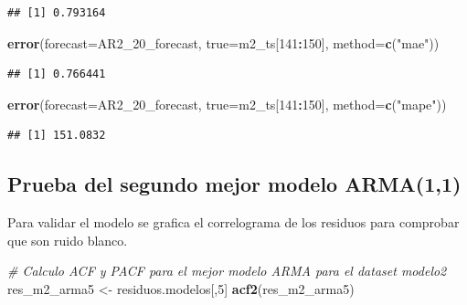 \documentclass[
  11pt,
]{article}
\newenvironment{Shaded}{\begin{snugshade}}{\end{snugshade}}
\newcommand{\CommentTok}[1]{\textcolor[rgb]{0.56,0.35,0.01}{\textit{#1}}}
\newcommand{\DataTypeTok}[1]{\textcolor[rgb]{0.13,0.29,0.53}{#1}}
\newcommand{\DecValTok}[1]{\textcolor[rgb]{0.00,0.00,0.81}{#1}}
\newcommand{\KeywordTok}[1]{\textcolor[rgb]{0.13,0.29,0.53}{\textbf{#1}}}
\newcommand{\NormalTok}[1]{#1}
\newcommand{\OperatorTok}[1]{\textcolor[rgb]{0.81,0.36,0.00}{\textbf{#1}}}
\newcommand{\StringTok}[1]{\textcolor[rgb]{0.31,0.60,0.02}{#1}}
\begin{document}
\begin{verbatim}
## [1] 0.793164
\end{verbatim}

\begin{Shaded}
\begin{Highlighting}[]
\KeywordTok{error}\NormalTok{(}\DataTypeTok{forecast=}\NormalTok{AR2_}\DecValTok{20}\NormalTok{_forecast, }\DataTypeTok{true=}\NormalTok{m2_ts[}\DecValTok{141}\OperatorTok{:}\DecValTok{150}\NormalTok{], }\DataTypeTok{method=}\KeywordTok{c}\NormalTok{(}\StringTok{"mae"}\NormalTok{))}
\end{Highlighting}
\end{Shaded}

\begin{verbatim}
## [1] 0.766441
\end{verbatim}

\begin{Shaded}
\begin{Highlighting}[]
\KeywordTok{error}\NormalTok{(}\DataTypeTok{forecast=}\NormalTok{AR2_}\DecValTok{20}\NormalTok{_forecast, }\DataTypeTok{true=}\NormalTok{m2_ts[}\DecValTok{141}\OperatorTok{:}\DecValTok{150}\NormalTok{], }\DataTypeTok{method=}\KeywordTok{c}\NormalTok{(}\StringTok{"mape"}\NormalTok{))}
\end{Highlighting}
\end{Shaded}

\begin{verbatim}
## [1] 151.0832
\end{verbatim}

\clearpage

\hypertarget{prueba-del-segundo-mejor-modelo-arma11}{%
\subsection{Prueba del segundo mejor modelo
ARMA(1,1)}\label{prueba-del-segundo-mejor-modelo-arma11}}

Para validar el modelo se grafica el correlograma de los residuos para
comprobar que son ruido blanco.

\begin{Shaded}
\begin{Highlighting}[]
\CommentTok{# Calculo ACF y PACF para el mejor modelo ARMA para el dataset modelo2}
\NormalTok{res_m2_arma5 <-}\StringTok{ }\NormalTok{residuos.modelos[,}\DecValTok{5}\NormalTok{]}
\KeywordTok{acf2}\NormalTok{(res_m2_arma5)}
\end{Highlighting}
\end{Shaded}
\end{document}
